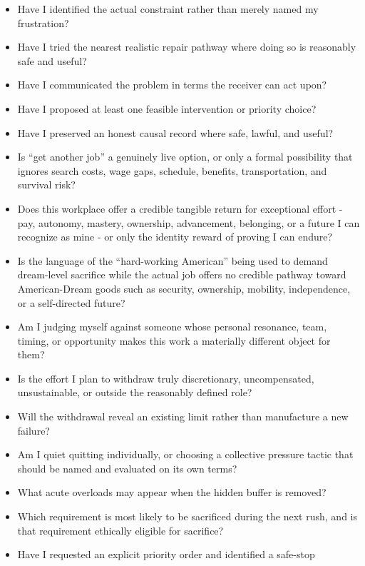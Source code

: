\documentclass[11pt,oneside]{article}
\providecommand{\tightlist}{%
  \setlength{\itemsep}{0.22em}\setlength{\parskip}{0pt}}
\begin{document}
\begin{itemize}
\tightlist
\item
  Have I identified the actual constraint rather than merely named my
  frustration?
\item
  Have I tried the nearest realistic repair pathway where doing so is
  reasonably safe and useful?
\item
  Have I communicated the problem in terms the receiver can act upon?
\item
  Have I proposed at least one feasible intervention or priority choice?
\item
  Have I preserved an honest causal record where safe, lawful, and
  useful?
\item
  Is ``get another job'' a genuinely live option, or only a formal
  possibility that ignores search costs, wage gaps, schedule, benefits,
  transportation, and survival risk?
\item
  Does this workplace offer a credible tangible return for exceptional
  effort - pay, autonomy, mastery, ownership, advancement, belonging, or
  a future I can recognize as mine - or only the identity reward of
  proving I can endure?
\item
  Is the language of the ``hard-working American'' being used to demand
  dream-level sacrifice while the actual job offers no credible pathway
  toward American-Dream goods such as security, ownership, mobility,
  independence, or a self-directed future?
\item
  Am I judging myself against someone whose personal resonance, team,
  timing, or opportunity makes this work a materially different object
  for them?
\item
  Is the effort I plan to withdraw truly discretionary, uncompensated,
  unsustainable, or outside the reasonably defined role?
\item
  Will the withdrawal reveal an existing limit rather than manufacture a
  new failure?
\item
  Am I quiet quitting individually, or choosing a collective pressure
  tactic that should be named and evaluated on its own terms?
\item
  What acute overloads may appear when the hidden buffer is removed?
\item
  Which requirement is most likely to be sacrificed during the next
  rush, and is that requirement ethically eligible for sacrifice?
\item
  Have I requested an explicit priority order and identified a safe-stop

\end{itemize}
\end{document}
